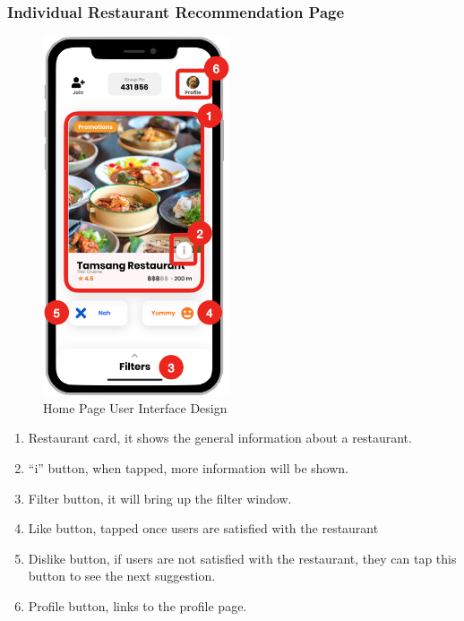 \documentclass[12pt,oneside,openright,a4paper]{cpe-english-project}
\begin{document}
\newpage
\subsubsection{Individual Restaurant Recommendation Page}
\begin{figure}[H]\centering
\includegraphics[height=300pt]{./images/3ui_HomePageUserInterfaceDesign.png}
\caption{Home Page User Interface Design}\label{fig:3ui_HomePageUserInterfaceDesign}
\end{figure}\vspace{-24pt}

\begin{enumerate}
\item Restaurant card, it shows the general information about a restaurant.
\item “i” button, when tapped, more information will be shown.
\item Filter button, it will bring up the filter window.
\item Like button, tapped once users are satisfied with the restaurant
\item Dislike button, if users are not satisfied with the restaurant, they can tap this button to see the next suggestion.
\item Profile button, links to the profile page.
\end{enumerate}
\end{document}
